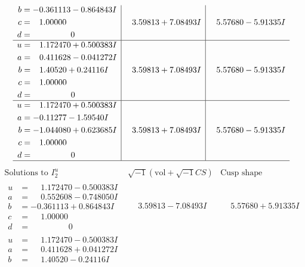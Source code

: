 \documentclass[1p]{elsarticle_modified}
\theoremstyle{definition}
\newcommand{\I}{\sqrt{-1}}
\begin{document}
$$\begin{array}{c|c|c}
\begin{aligned}
b &= -0.361113 - 0.864843 I \\
c &= \phantom{-}1.00000\phantom{ +0.000000I} \\
d &= \phantom{-0.000000 } 0\end{aligned}
 & \phantom{-}3.59813 + 7.08493 I & \phantom{-}5.57680 - 5.91335 I \\ \hline\begin{aligned}
u &= \phantom{-}1.172470 + 0.500383 I \\
a &= \phantom{-}0.411628 - 0.041272 I \\
b &= \phantom{-}1.40520 + 0.24116 I \\
c &= \phantom{-}1.00000\phantom{ +0.000000I} \\
d &= \phantom{-0.000000 } 0\end{aligned}
 & \phantom{-}3.59813 + 7.08493 I & \phantom{-}5.57680 - 5.91335 I \\ \hline\begin{aligned}
u &= \phantom{-}1.172470 + 0.500383 I \\
a &= -0.11277 - 1.59540 I \\
b &= -1.044080 + 0.623685 I \\
c &= \phantom{-}1.00000\phantom{ +0.000000I} \\
d &= \phantom{-0.000000 } 0\end{aligned}
 & \phantom{-}3.59813 + 7.08493 I & \phantom{-}5.57680 - 5.91335 I\\
 \hline 
 \end{array}$$\newpage$$\begin{array}{c|c|c}  
\text{Solutions to }I^u_{2}& \I (\text{vol} + \sqrt{-1}CS) & \text{Cusp shape}\\
 \hline 
\begin{aligned}
u &= \phantom{-}1.172470 - 0.500383 I \\
a &= \phantom{-}0.552608 - 0.748050 I \\
b &= -0.361113 + 0.864843 I \\
c &= \phantom{-}1.00000\phantom{ +0.000000I} \\
d &= \phantom{-0.000000 } 0\end{aligned}
 & \phantom{-}3.59813 - 7.08493 I & \phantom{-}5.57680 + 5.91335 I \\ \hline\begin{aligned}
u &= \phantom{-}1.172470 - 0.500383 I \\
a &= \phantom{-}0.411628 + 0.041272 I \\
b &= \phantom{-}1.40520 - 0.24116 I \\

\end{aligned}
\end{array}$$
\end{document}
